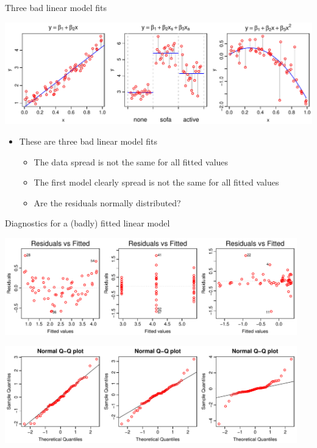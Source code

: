 \documentclass[xcolor=x11names,handout,compress]{beamer}
\renewcommand{\(}{\begin{columns}}
\renewcommand{\)}{\end{columns}}
\newcommand{\<}[1]{\begin{column}{#1}}
\renewcommand{\>}{\end{column}}
\begin{document}

\begin{frame}{Three bad linear model fits}

\includegraphics[width=\textwidth]{NonConstantVarianceMods.pdf}

\begin{itemize}\itemsep6pt
\item These are three bad linear model fits
\pause 
\begin{itemize}[<+->]\itemsep6pt
    \item The data spread is not the same for all fitted values
    \item The first model clearly  spread is not the same for all fitted values
    \item Are the residuals normally distributed?
\end{itemize}
\end{itemize}

\end{frame}


\begin{frame}{Diagnostics for a (badly) fitted linear model}

\includegraphics[width=0.95\textwidth]{BadFitResid.pdf}

\pause

\includegraphics[width=0.95\textwidth]{BadQQNorm.pdf}


\end{frame}
\end{document}
